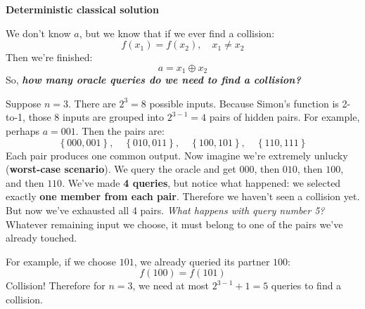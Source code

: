 \newpage

\begin{flushleft}
    \textcolor{Red2}{ \textbf{Deterministic classical solution}}
\end{flushleft}
We don't know $a$, but we know that if we ever find a collision:
\begin{equation*}
    f(x_1) = f(x_2), \quad x_1 \neq x_2
\end{equation*}
Then we're finished:
\begin{equation*}
    a = x_1 \oplus x_2
\end{equation*}
So, \textbf{\emph{how many oracle queries do we need to find a collision?}}

\highspace
Suppose $n=3$. There are $2^3 = 8$ possible inputs. Because Simon's function is 2-to-1, those 8 inputs are grouped into $2^{3-1} = 4$ pairs of hidden pairs. For example, perhaps $a = 001$. Then the pairs are:
\begin{equation*}
    \left\{000, 001\right\}, \quad \left\{010, 011\right\}, \quad \left\{100, 101\right\}, \quad \left\{110, 111\right\}
\end{equation*}
Each pair produces one common output. Now imagine we're extremely unlucky (\textbf{worst-case scenario}). We query the oracle and get $000$, then $010$, then $100$, and then $110$. We've made \textbf{4 queries}, but notice what happened: we selected exactly \textbf{one member from each pair}. Therefore we haven't seen a collision yet. But now we've exhausted all 4 pairs. \emph{What happens with query number 5?} Whatever remaining input we choose, it must belong to one of the pairs we've already touched.

\highspace
For example, if we choose $101$, we already queried its partner $100$:
\begin{equation*}
    f(100) = f(101)
\end{equation*}
Collision! Therefore for $n=3$, we need at most $2^{3-1} + 1 = 5$ queries to find a collision.

